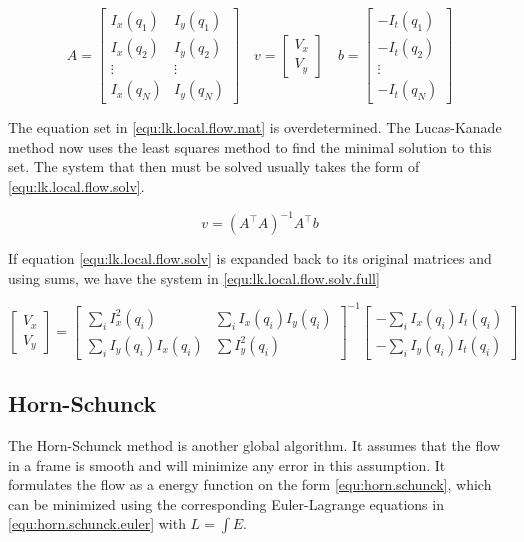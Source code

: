 \begin{equation} \label{equ:lk.local.flow.mat}
A = \begin{bmatrix}
		I_x(q_1) 	& I_y(q_1) \\
		I_x(q_2) 	& I_y(q_2) \\ 
		\vdots 		& \vdots \\
		I_x(q_N)	& I_y(q_N)
	\end{bmatrix} \quad 
v =	\begin{bmatrix}
		V_x \\ V_y
	\end{bmatrix} \quad
b = \begin{bmatrix}
		-I_t(q_1) \\ -I_t(q_2) \\ \vdots \\ -I_t(q_N)
	\end{bmatrix}
\end{equation}

The equation set in \eqref{equ:lk.local.flow.mat} is overdetermined. The Lucas-Kanade method now uses the 
least squares method to find the minimal solution to this set. The system that then must be solved usually takes the 
form of \eqref{equ:lk.local.flow.solv}.

\begin{equation}\label{equ:lk.local.flow.solv}
	v = \left(A^\top A\right)^{-1} A^\top b
\end{equation}

If equation \eqref{equ:lk.local.flow.solv} is expanded back to its original matrices and using sums, we have the system in \eqref{equ:lk.local.flow.solv.full}

\begin{equation}\label{equ:lk.local.flow.solv.full}
	\begin{bmatrix}
		V_x \\ V_y
	\end{bmatrix} = 
	\begin{bmatrix}
		\sum_ i{I_x^2(q_i)} 	 & \sum_i{I_x(q_i)I_y(q_i)} \\
		\sum_i{I_y(q_i)I_x(q_i)} & \sum{I_y^2(q_i)}
	\end{bmatrix}^{-1}
	\begin{bmatrix}
		-\sum_i{I_x(q_i)I_t(q_i)} \\ -\sum_i{I_y(q_i)I_t(q_i)}
	\end{bmatrix}
\end{equation}

\subsection{Horn-Schunck}\label{sec:horn-schunck}
The Horn-Schunck method is another global algorithm\citet{horn80}. It assumes that the flow in a frame is smooth and will minimize any error in this assumption.
It formulates the flow as a energy function on the form \eqref{equ:horn.schunck}, which can be minimized using the corresponding Euler-Lagrange equations in \eqref{equ:horn.schunck.euler} with
$L=\int{E}$.

